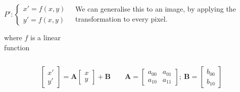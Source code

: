 \documentclass[9pt, aspectratio=169]{beamer}
\begin{document}
\begin{frame}
\begin{columns}
\begin{column}{0.5\textwidth}
{                $$P': \begin{cases}x' = f(x, y) + a\\y' = f(x, y) + b\end{cases}$$
                \begin{center}
                    where $f$ is a linear function
                \end{center}
            }
        \end{column}
        \pause
        \begin{column}{0.5\textwidth}
            {We can generalise this to an image, by applying the transformation to every pixel.
                \begin{center}
                    {
                    }
                \end{center}
            }
        \end{column}
    \end{columns}
    \pause
    $$\begin{bmatrix}x'\\y'\end{bmatrix}=\mathbf{A}\begin{bmatrix}x\\y\end{bmatrix}+\mathbf{B}\hspace{2em}\mathbf{A}=\begin{bmatrix}a_{00}&a_{01}\\a_{10}&a_{11}\end{bmatrix};~\mathbf{B}=\begin{bmatrix}b_{00}\\b_{10}\end{bmatrix}$$
\end{frame}
\end{document}
